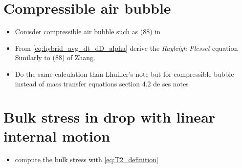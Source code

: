 \section{Compressible air bubble}
\begin{itemize}
    \item Conisder compressible air bubble such as (88) in \citet{zhang1994ensemble}
    \item From \ref{eq:hybrid_avg_dt_dD_alpha} derive the \textit{Rayleigh-Plesset} equation Similarly to (88) of Zhang. 
    \item Do the same calculation than Lhuiller's note but for compressible bubble instead of mass transfer equations section 4.2 de ses notes
\end{itemize}
\section{Bulk stress in drop with linear internal motion}

\begin{itemize}
    \item compute the bulk stress with \ref{eq:T2_definition}
\end{itemize}



